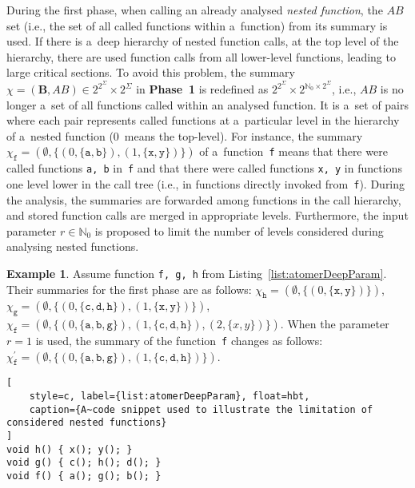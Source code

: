 \documentclass{ExcelAtFIT}
\theoremstyle{definition}
\newtheorem{example}{Example}[section]
\begin{document}
During the first phase, when calling an already analysed \emph{nested function}, the $ AB $ set (i.e., the set of all called functions within a~function) from its summary is used. If there is a~deep hierarchy of nested function calls, at the top level of the hierarchy, there are used function calls from all lower-level functions, leading to large critical sections. To avoid this problem, the summary $ \chi = {(\boldsymbol{B}, AB)} \in 2^{2^\Sigma} \times 2^\Sigma $ in \textbf{Phase~1} is redefined as $ 2^{2^\Sigma} \times 2^{\mathbb{N}_0 \times 2^\Sigma} $, i.e., $ AB $ is no longer a~set of all functions called within an analysed function. It is a~set of pairs where each pair represents called functions at a~particular level in the hierarchy of a~nested function (0~means the top-level). For instance, the summary $ \chi_\mathtt{f} = (\emptyset, \{{(0, \{\mathtt{a, b}\})}, {(1, \{\mathtt{x, y}\})}\}) $ of a~function~\texttt{f} means that there were called functions \texttt{a, b} in~\texttt{f} and that there were called functions \texttt{x, y} in functions one level lower in the call tree (i.e., in functions directly invoked from~\texttt{f}). During the analysis, the summaries are forwarded among functions in the call hierarchy, and stored function calls are merged in appropriate levels. Furthermore, the input parameter $ r \in \mathbb{N}_0 $ is proposed to limit the number of levels considered during analysing nested functions.

\begin{example}
    Assume function \texttt{f, g, h} from Listing~\ref{list:atomerDeepParam}. Their summaries for the first phase are as follows: $ \chi_\mathtt{h} = (\emptyset, \{(0, \{\mathtt{x, y}\})\}) $, $ \chi_\mathtt{g} = (\emptyset, \{(0, \{\mathtt{c, d, h}\}), \allowbreak (1, \{\mathtt{x, y}\})\}) $, $ \chi_\mathtt{f} = (\emptyset, \{(0, \{\mathtt{a, b, g}\}), (1, \{\mathtt{c, d, h}\}), (2, \allowbreak \{x, y\})\}) $. When the parameter $ r = 1 $ is used, the summary of the function~\texttt{f} changes as follows: $ \chi_\mathtt{f}^\prime = (\emptyset, \{(0, \{\mathtt{a, b, g}\}), (1, \{\mathtt{c, d, h}\})\}) $.
\end{example}

\begin{lstlisting}[
    style=c, label={list:atomerDeepParam}, float=hbt,
    caption={A~code snippet used to illustrate the limitation of considered nested functions}
]
void h() { x(); y(); }
void g() { c(); h(); d(); }
void f() { a(); g(); b(); }
\end{lstlisting}
\end{document}
